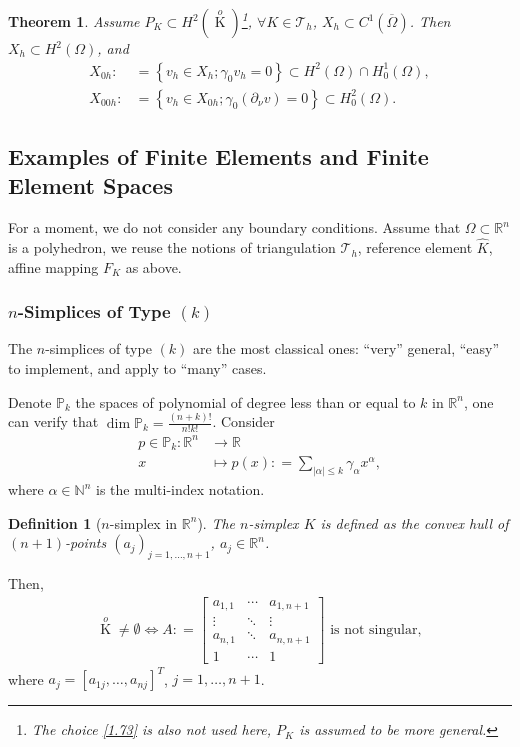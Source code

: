 \documentclass[11pt,a4paper,center,notitlepage]{article}
\numberwithin{equation}{section}
\newtheorem{definition}{Definition}[section]
\newtheorem{theorem}{Theorem}[section]
\begin{document}
\begin{theorem}
Assume ${P_K} \subset {H^2}\left( {\mathop K\limits^o } \right)$\footnote{The choice \eqref{1.73} is also not used here, $P_K$ is assumed to be more general.}, $\forall K\in \mathcal{T}_h$, $X_h \subset C^1 \left(\overline{\Omega}\right)$. Then $X_h \subset H^2\left(\Omega\right)$, and
\begin{align}
{X_{0h}}: &= \left\{ {{v_h} \in {X_h};{\gamma _0}{v_h} = 0} \right\} \subset {H^2}\left( \Omega  \right) \cap H_0^1\left( \Omega  \right),\\
{X_{00h}}: &= \left\{ {{v_h} \in {X_{0h}};{\gamma _0}\left( {{\partial _\nu }v} \right) = 0} \right\} \subset H_0^2\left( \Omega  \right).
\end{align}
\end{theorem}

\subsection{Examples of Finite Elements and Finite Element Spaces}
For a moment, we do not consider any boundary conditions. Assume that $\Omega \subset \mathbb{R}^n$ is a polyhedron, we reuse the notions of triangulation $\mathcal{T}_h$, reference element $\widehat{K}$, affine mapping $F_K$ as above.
\subsubsection{$n$-Simplices of Type $\left(k\right)$}
The $n$-simplices of type $\left(k\right)$ are the most classical ones: ``very'' general, ``easy'' to implement, and apply to ``many'' cases.

Denote $\mathbb{P}_k$ the spaces of polynomial of degree less than or equal to $k$ in $\mathbb{R}^n$, one can verify that $\dim \mathbb{P}_k =\frac{\left(n+k\right)!}{n!k!}$. Consider
\begin{align}
p \in {\mathbb{P}_k}:{\mathbb{R}^n} &\to \mathbb{R}\\
x &\mapsto p\left( x \right): = \sum\limits_{\left| \alpha  \right| \le k} {{\gamma _\alpha }{x^\alpha }} ,
\end{align}
where $\alpha \in \mathbb{N}^n$ is the multi-index notation.
\begin{definition}[$n$-simplex in $\mathbb{R}^n$]
The $n$-simplex $K$ is defined as the convex hull of $\left(n+1\right)$-points $\left(a_j\right)_{j=1,\ldots,n+1}$, $a_j\in \mathbb{R}^n$. 
\end{definition}
Then, 
\begin{align}
\mathop K\limits^o  \ne \emptyset  \Leftrightarrow A: = \left[ {\begin{array}{*{20}{c}}
{{a_{1,1}}}& \cdots &{{a_{1,n + 1}}}\\
 \vdots & \ddots & \vdots \\
{{a_{n,1}}}& \ddots &{{a_{n,n + 1}}}\\
1& \cdots &1
\end{array}} \right] \mbox{ is not singular} ,
\end{align}
where ${a_j} = \left[a_{1j},\ldots,a_{nj}\right]^T$, $j=1,\ldots,n+1$. 
\end{document}
